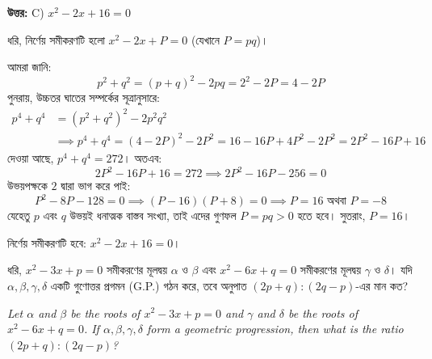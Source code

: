 \documentclass[12pt, a4paper]{article}
\begin{document}
\vspace{0.5em}
\begin{tcolorbox}[answerbox]
    \textbf{\color{success} উত্তর:} C) $x^2 - 2x + 16 = 0$
\end{tcolorbox}
\vspace{1em}

\begin{tcolorbox}[solutionbox={সমাধান (Solution)}]
    \noindent
    ধরি, নির্ণেয় সমীকরণটি হলো $x^2 - 2x + P = 0$ (যেখানে $P = pq$)। 
    
    আমরা জানি:
    \[ p^2 + q^2 = (p+q)^2 - 2pq = 2^2 - 2P = 4 - 2P \]
    পুনরায়, উচ্চতর ঘাতের সম্পর্কের সূত্রানুসারে:
    \begin{align*}
        p^4 + q^4 &= (p^2 + q^2)^2 - 2p^2q^2 \\
        &\implies p^4 + q^4 = (4 - 2P)^2 - 2P^2 = 16 - 16P + 4P^2 - 2P^2 = 2P^2 - 16P + 16
    \end{align*}
    দেওয়া আছে, $p^4 + q^4 = 272$। অতএব:
    \[ 2P^2 - 16P + 16 = 272 \implies 2P^2 - 16P - 256 = 0 \]
    উভয়পক্ষকে $2$ দ্বারা ভাগ করে পাই:
    \[ P^2 - 8P - 128 = 0 \implies (P-16)(P+8) = 0 \implies P = 16 \text{ অথবা } P = -8 \]
    যেহেতু $p$ এবং $q$ উভয়ই ধনাত্মক বাস্তব সংখ্যা, তাই এদের গুণফল $P = pq > 0$ হতে হবে। সুতরাং, $P = 16$। 
    
    নির্ণেয় সমীকরণটি হবে: $x^2 - 2x + 16 = 0$।
\end{tcolorbox}

\vspace{1em}

\begin{tcolorbox}[questionbox={প্রশ্ন (Question) 39}]
    \noindent
    ধরি, $x^2 - 3x + p = 0$ সমীকরণের মূলদ্বয় $\alpha$ ও $\beta$ এবং $x^2 - 6x + q = 0$ সমীকরণের মূলদ্বয় $\gamma$ ও $\delta$। যদি $\alpha, \beta, \gamma, \delta$ একটি গুণোত্তর প্রগমন (G.P.) গঠন করে, তবে অনুপাত $(2p+q) : (2q-p)$-এর মান কত?
    
    \vspace{0.8em}
    \begin{english}
    \noindent\textit{\color{darkgray}
    Let $\alpha$ and $\beta$ be the roots of $x^2 - 3x + p = 0$ and $\gamma$ and $\delta$ be the roots of $x^2 - 6x + q = 0$. If $\alpha, \beta, \gamma, \delta$ form a geometric progression, then what is the ratio $(2p+q) : (2q-p)$?
    }
    \end{english}
\end{tcolorbox}
\end{document}
